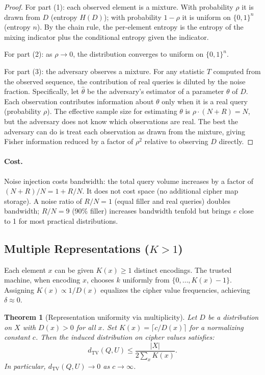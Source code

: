 \documentclass[11pt]{article}
\theoremstyle{definition}
\theoremstyle{plain}
\newtheorem{theorem}{Theorem}[section]
\theoremstyle{remark}
\newcommand{\TV}{d_{\mathrm{TV}}}
\newcommand{\B}{\{0,1\}}
\begin{document}
\begin{proof}
For part (1): each observed element is a mixture.  With probability
$\rho$ it is drawn from $D$ (entropy $H(D)$); with probability
$1 - \rho$ it is uniform on $\B^n$ (entropy $n$).  By the chain rule,
the per-element entropy is the entropy of the mixing indicator plus the
conditional entropy given the indicator.

For part (2): as $\rho \to 0$, the distribution converges to uniform on
$\B^n$.

For part (3): the adversary observes a mixture.  For any statistic
$T$ computed from the observed sequence, the contribution of real
queries is diluted by the noise fraction.  Specifically, let
$\hat{\theta}$ be the adversary's estimator of a parameter $\theta$ of
$D$.  Each observation contributes information about $\theta$ only when
it is a real query (probability $\rho$).  The effective sample size for
estimating $\theta$ is $\rho \cdot (N + R) = N$, but the adversary does
not know which observations are real.  The best the adversary can do is
treat each observation as drawn from the mixture, giving Fisher
information reduced by a factor of $\rho^2$ relative to observing $D$
directly.
\end{proof}

\paragraph{Cost.}
Noise injection costs bandwidth: the total query volume increases by a
factor of $(N + R) / N = 1 + R/N$.  It does not cost space (no
additional cipher map storage).  A noise ratio of $R/N = 1$ (equal
filler and real queries) doubles bandwidth; $R/N = 9$ (90\% filler)
increases bandwidth tenfold but brings $e$ close to 1 for most practical
distributions.

\subsection{Multiple Representations ($K > 1$)}
\label{subsec:multiple-reps}

Each element $x$ can be given $K(x) \geq 1$ distinct encodings.  The
trusted machine, when encoding $x$, chooses $k$ uniformly from
$\{0, \ldots, K(x) - 1\}$.  Assigning $K(x) \propto 1/D(x)$ equalizes
the cipher value frequencies, achieving $\delta \approx 0$.

\begin{theorem}[Representation uniformity via multiplicity]
\label{thm:multiplicity}
Let $D$ be a distribution on $X$ with $D(x) > 0$ for all $x$.  Set
$K(x) = \lceil c / D(x) \rceil$ for a normalizing constant $c$.  Then the
induced distribution on cipher values satisfies:
\begin{equation}
\TV(Q, U) \leq \frac{|X|}{2 \sum_x K(x)}.
\end{equation}
In particular, $\TV(Q, U) \to 0$ as $c \to \infty$.
\end{theorem}
\end{document}
